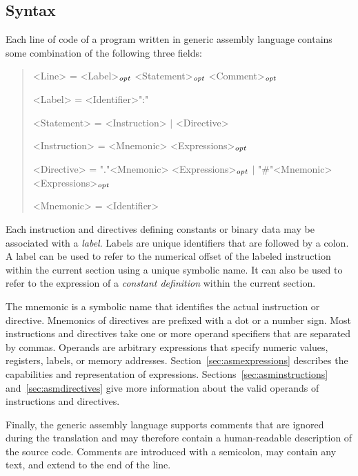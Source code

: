 \subsection{Syntax}

Each line of code of a program written in generic assembly language contains some combination of the following three fields:

\begin{quote}\begin{grammar}
<Line> = <Label>$_\mathit{opt}$ <Statement>$_\mathit{opt}$ <Comment>$_\mathit{opt}$ \par
<Label> = <Identifier>":" \par
<Statement> = <Instruction> $\mid$ <Directive> \par
<Instruction> = <Mnemonic> <Expressions>$_\mathit{opt}$ \par
<Directive> = "."<Mnemonic> <Expressions>$_\mathit{opt}$ $\mid$ "#"<Mnemonic> <Expressions>$_\mathit{opt}$ \par
<Mnemonic> = <Identifier> \par
\end{grammar}\end{quote}

Each instruction and directives defining constants or binary data may be associated with a \emph{label}.
Labels are unique identifiers that are followed by a colon.
A label can be used to refer to the numerical offset of the labeled instruction within the current section using a unique symbolic name.
It can also be used to refer to the expression of a \emph{constant definition} within the current section.

The mnemonic is a symbolic name that identifies the actual instruction or directive.
Mnemonics of directives are prefixed with a dot or a number sign.
Most instructions and directives take one or more operand specifiers that are separated by commas.
Operands are arbitrary expressions that specify numeric values, registers, labels, or memory addresses.
Section~\ref{sec:asmexpressions} describes the capabilities and representation of expressions.
Sections~\ref{sec:asminstructions} and~\ref{sec:asmdirectives} give more information about the valid operands of instructions and directives.

Finally, the generic assembly language supports comments that are ignored during the translation and may therefore contain a human-readable description of the source code.
Comments are introduced with a semicolon, may contain any text, and extend to the end of the line.

